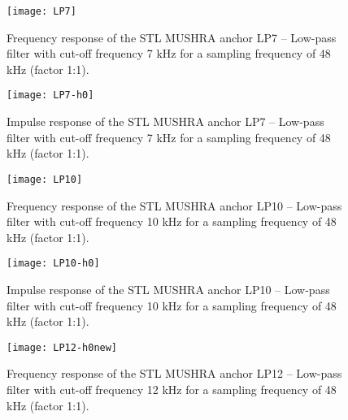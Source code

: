 \begin{figure}[hbtp]
  \begin{center}
 \texttt{[image: LP7]}
  \end{center}
  \caption{\SF Frequency response of the STL MUSHRA anchor LP7 -- Low-pass filter with cut-off frequency 7 kHz for a sampling frequency of 48 kHz (factor 1:1).
           \label{LP7-frq}
          }
\end{figure}


\begin{figure}[hbtp]
  \begin{center}
 \texttt{[image: LP7-h0]}
  \end{center}
  \caption{\SF Impulse response of the STL MUSHRA anchor LP7 -- Low-pass filter with cut-off frequency 7 kHz for a sampling frequency of 48 kHz (factor 1:1).
           \label{LP7-ir}
          }
\end{figure}


\begin{figure}[hbtp]
  \begin{center}
 \texttt{[image: LP10]}
  \end{center}
  \caption{\SF Frequency response of the STL MUSHRA anchor LP10 -- Low-pass filter with cut-off frequency 10 kHz for a sampling frequency of 48 kHz (factor 1:1).
           \label{LP10-frq}
          }
\end{figure}


\begin{figure}[hbtp]
  \begin{center}
 \texttt{[image: LP10-h0]}
  \end{center}
  \caption{\SF Impulse response of the STL MUSHRA anchor LP10 -- Low-pass filter with cut-off frequency 10 kHz for a sampling frequency of 48 kHz (factor 1:1).
           \label{LP10-ir}
          }
\end{figure}

\begin{figure}[hbtp]
  \begin{center}
 \texttt{[image: LP12-h0new]}
  \end{center}
  \caption{\SF Frequency response of the STL MUSHRA anchor LP12 -- Low-pass filter with cut-off frequency 12 kHz for a sampling frequency of 48 kHz (factor 1:1).
           \label{LP12-frq}
          }
\end{figure}



